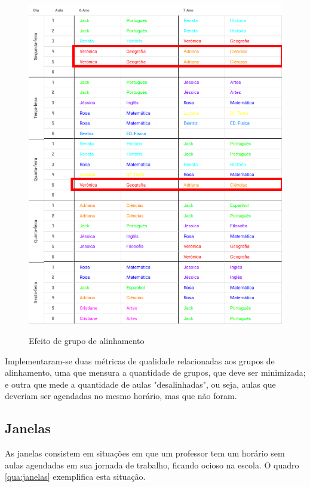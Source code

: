 \begin{figure}[!htb]
	\centering
	\caption{Efeito de grupo de alinhamento}
	\includegraphics[width=1\textwidth]{./dados/figuras/alinhados}
	\label{fig:alinhados}
\end{figure}
\pagebreak

Implementaram-se duas métricas de qualidade relacionadas aos grupos de alinhamento, uma que mensura a quantidade de grupos, que deve ser minimizada; e outra que mede a quantidade de aulas "desalinhadas", ou seja, aulas que deveriam ser agendadas no mesmo horário, mas que não foram.

\subsection{Janelas}

As janelas consistem em situações em que um professor tem um horário sem aulas agendadas em sua jornada de trabalho, ficando ocioso na escola. O quadro \ref{qua:janelas} exemplifica esta situação.

